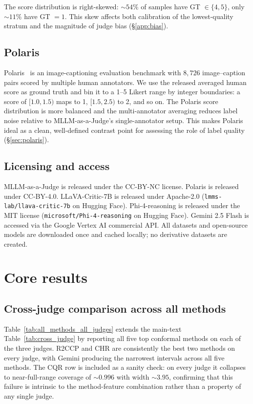 \documentclass{article}
\begin{document}
The score distribution is right-skewed: $\sim 54\%$ of samples have GT $\in \{4, 5\}$, only $\sim 11\%$ have GT $= 1$. This skew affects both calibration of the lowest-quality stratum and the magnitude of judge bias (\S\ref{app:bias}).

\subsection{Polaris}

Polaris~\citep{wada2024polos} is an image-captioning evaluation benchmark with $8{,}726$ image--caption pairs scored by multiple human annotators. We use the released averaged human score as ground truth and bin it to a 1--5 Likert range by integer boundaries: a score of $[1.0, 1.5)$ maps to 1, $[1.5, 2.5)$ to 2, and so on. The Polaris score distribution is more balanced and the multi-annotator averaging reduces label noise relative to MLLM-as-a-Judge's single-annotator setup. This makes Polaris ideal as a clean, well-defined contrast point for assessing the role of label quality (\S\ref{sec:polaris}).

\subsection{Licensing and access}

MLLM-as-a-Judge is released under the CC-BY-NC license. Polaris is released under CC-BY-4.0. LLaVA-Critic-7B is released under Apache-2.0 (\texttt{lmms-lab/llava-critic-7b} on Hugging Face). Phi-4-reasoning is released under the MIT license (\texttt{microsoft/Phi-4-reasoning} on Hugging Face). Gemini 2.5 Flash is accessed via the Google Vertex AI commercial API. All datasets and open-source models are downloaded once and cached locally; no derivative datasets are created.

\section{Core results}
\label{app:core_results}

\subsection{Cross-judge comparison across all methods}
\label{app:all_methods}

Table~\ref{tab:all_methods_all_judges} extends the main-text Table~\ref{tab:cross_judge} by reporting all five top conformal methods on each of the three judges. R2CCP and CHR are consistently the best two methods on every judge, with Gemini producing the narrowest intervals across all five methods. The CQR row is included as a sanity check: on every judge it collapses to near-full-range coverage of $\sim 0.996$ with width $\sim 3.95$, confirming that this failure is intrinsic to the method-feature combination rather than a property of any single judge.
\end{document}
